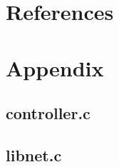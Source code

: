\documentclass{article}
\begin{document}
\section*{References}

\printbibliography

\section*{Appendix}

\subsection*{controller.c}


\subsection*{libnet.c}

\end{document}
